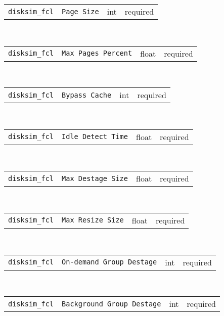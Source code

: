 \noindent 
\begin{tabular}{|p{\lpmodwidth}|p{\lpnamewidth}|p{0.5in}|p{0.5in}|}
\cline{1-4}
\texttt{disksim\_fcl} & \texttt{Page Size} & int & required \\ 
\cline{1-4}
\end{tabular}\\ 
\noindent 
\begin{tabular}{|p{\lpmodwidth}|p{\lpnamewidth}|p{0.5in}|p{0.5in}|}
\cline{1-4}
\texttt{disksim\_fcl} & \texttt{Max Pages Percent} & float & required \\ 
\cline{1-4}
\end{tabular}\\ 
\noindent 
\begin{tabular}{|p{\lpmodwidth}|p{\lpnamewidth}|p{0.5in}|p{0.5in}|}
\cline{1-4}
\texttt{disksim\_fcl} & \texttt{Bypass Cache} & int & required \\ 
\cline{1-4}
\end{tabular}\\ 
\noindent 
\begin{tabular}{|p{\lpmodwidth}|p{\lpnamewidth}|p{0.5in}|p{0.5in}|}
\cline{1-4}
\texttt{disksim\_fcl} & \texttt{Idle Detect Time} & float & required \\ 
\cline{1-4}
\end{tabular}\\ 
\noindent 
\begin{tabular}{|p{\lpmodwidth}|p{\lpnamewidth}|p{0.5in}|p{0.5in}|}
\cline{1-4}
\texttt{disksim\_fcl} & \texttt{Max Destage Size} & float & required \\ 
\cline{1-4}
\end{tabular}\\ 
\noindent 
\begin{tabular}{|p{\lpmodwidth}|p{\lpnamewidth}|p{0.5in}|p{0.5in}|}
\cline{1-4}
\texttt{disksim\_fcl} & \texttt{Max Resize Size} & float & required \\ 
\cline{1-4}
\end{tabular}\\ 
\noindent 
\begin{tabular}{|p{\lpmodwidth}|p{\lpnamewidth}|p{0.5in}|p{0.5in}|}
\cline{1-4}
\texttt{disksim\_fcl} & \texttt{On-demand Group Destage} & int & required \\ 
\cline{1-4}
\end{tabular}\\ 
\noindent 
\begin{tabular}{|p{\lpmodwidth}|p{\lpnamewidth}|p{0.5in}|p{0.5in}|}
\cline{1-4}
\texttt{disksim\_fcl} & \texttt{Background Group Destage} & int & required \\ 
\cline{1-4}
\end{tabular}\\ 
